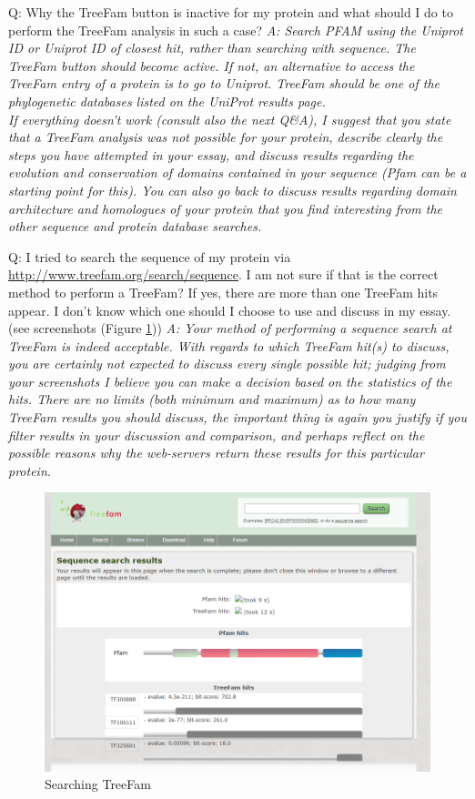 \documentclass[10pt,a4paper]{article}
\begin{document}
Q:  Why the TreeFam button is inactive for my protein and what should I do to perform the TreeFam analysis in such a case? \newline
\textit{A: Search PFAM using the Uniprot ID or Uniprot ID of closest hit, rather than searching with sequence. The TreeFam button should become active. If not, an alternative to access the TreeFam entry of a protein is to go to Uniprot. TreeFam should be one of the phylogenetic databases listed on the UniProt results page. \\ 
If everything doesn't work (consult also the next Q\&A), I suggest that you state that a TreeFam analysis was not possible for your protein, describe clearly the steps you have attempted in your essay, and discuss results regarding the evolution and conservation of domains contained in your sequence (Pfam can be a starting point for this). You can also go back to discuss results regarding domain architecture and homologues of your protein that you find interesting from the other sequence and protein database searches. } \newline

Q: I tried to search the sequence of my protein via \url{http://www.treefam.org/search/sequence}. I am not sure if that is the correct method to perform a TreeFam? If yes, there are more than one TreeFam hits appear. I don't know which one should I choose to use and discuss in my essay. (see screenshots (Figure \ref{figure:treefamSearch}))
\textit{A: Your method of performing a sequence search at TreeFam is indeed acceptable. With regards to which TreeFam hit(s) to discuss, you are certainly not expected to discuss every single possible hit; judging from your screenshots I believe you can make a decision based on the statistics of the hits. There are no limits (both minimum and maximum) as to how many TreeFam results you should discuss, the important thing is again you justify if you filter results in your discussion and comparison, and perhaps reflect on the possible reasons why the web-servers return these results for this particular protein.} \newline
\begin{figure}[!ht]
\centering \includegraphics[width=\textwidth]{treefam_search.png}
\caption{Searching TreeFam}
\label{figure:treefamSearch}
\end{figure}
\end{document}
